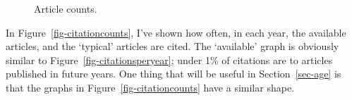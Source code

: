 \documentclass[
  12pt,
  letterpaper,
  DIV=11,
  numbers=noendperiod]{scrartcl}
\begin{document}
\begin{figure}
\begin{minipage}{\linewidth}
{}


\end{minipage}%

\caption{\label{fig-articlecounts}Article counts.}

\end{figure}%

In Figure~\ref{fig-citationcounts}, I've shown how often, in each year,
the available articles, and the `typical' articles are cited. The
`available' graph is obviously similar to
Figure~\ref{fig-citationsperyear}; under 1\% of citations are to
articles published in future years. One thing that will be useful in
Section~\ref{sec-age} is that the graphs in
Figure~\ref{fig-citationcounts} have a similar shape.
\end{document}
